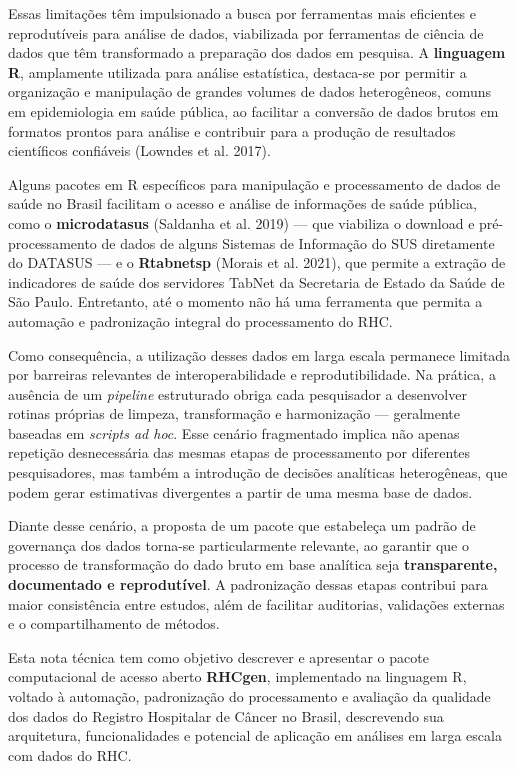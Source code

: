 \documentclass[
  brazilian,
  a4paper,
  oneside]{scrbook}
\begin{document}
Essas limitações têm impulsionado a busca por ferramentas mais
eficientes e reprodutíveis para análise de dados, viabilizada por
ferramentas de ciência de dados que têm transformado a preparação dos
dados em pesquisa. A \textbf{linguagem R}, amplamente utilizada para
análise estatística, destaca-se por permitir a organização e manipulação
de grandes volumes de dados heterogêneos, comuns em epidemiologia em
saúde pública, ao facilitar a conversão de dados brutos em formatos
prontos para análise e contribuir para a produção de resultados
científicos confiáveis ({Lowndes et al.} 2017).

Alguns pacotes em R específicos para manipulação e processamento de
dados de saúde no Brasil facilitam o acesso e análise de informações de
saúde pública, como o \textbf{microdatasus} (Saldanha et al. 2019) ---
que viabiliza o download e pré-processamento de dados de alguns Sistemas
de Informação do SUS diretamente do DATASUS --- e o \textbf{Rtabnetsp}
(Morais et al. 2021), que permite a extração de indicadores de saúde dos
servidores TabNet da Secretaria de Estado da Saúde de São Paulo.
Entretanto, até o momento não há uma ferramenta que permita a automação
e padronização integral do processamento do RHC.

Como consequência, a utilização desses dados em larga escala permanece
limitada por barreiras relevantes de interoperabilidade e
reprodutibilidade. Na prática, a ausência de um \emph{pipeline}
estruturado obriga cada pesquisador a desenvolver rotinas próprias de
limpeza, transformação e harmonização --- geralmente baseadas em
\emph{scripts ad hoc}. Esse cenário fragmentado implica não apenas
repetição desnecessária das mesmas etapas de processamento por
diferentes pesquisadores, mas também a introdução de decisões analíticas
heterogêneas, que podem gerar estimativas divergentes a partir de uma
mesma base de dados.

Diante desse cenário, a proposta de um pacote que estabeleça um padrão
de governança dos dados torna-se particularmente relevante, ao garantir
que o processo de transformação do dado bruto em base analítica seja
\textbf{transparente, documentado e reprodutível}. A padronização dessas
etapas contribui para maior consistência entre estudos, além de
facilitar auditorias, validações externas e o compartilhamento de
métodos.

Esta nota técnica tem como objetivo descrever e apresentar o pacote
computacional de acesso aberto \textbf{RHCgen}, implementado na
linguagem R, voltado à automação, padronização do processamento e
avaliação da qualidade dos dados do Registro Hospitalar de Câncer no
Brasil, descrevendo sua arquitetura, funcionalidades e potencial de
aplicação em análises em larga escala com dados do RHC.
\end{document}
